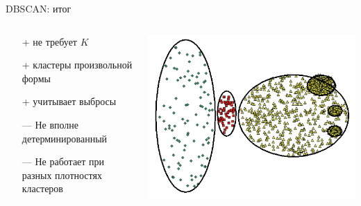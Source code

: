 \documentclass[10pt]{beamer}
\begin{document}
\begin{frame}{DBSCAN: итог}

\begin{columns}[C]
    \begin{column}{.6\textwidth} 
    \begin{itemize}
	\item[+] не требует $K$
	\item[+] кластеры произвольной формы
	\item[+] учитывает выбросы
	\item[---] Не вполне детерминированный
	\item[---] Не работает при разных плотностях кластеров
	\end{itemize}		    
    \end{column}
    \begin{column}{.4\textwidth}
    \vspace{1em}
    \includegraphics[scale=0.25]{images/dbprob.png}    
    \end{column}
\end{columns}

\end{frame}
\end{document}
